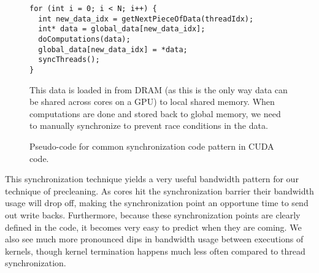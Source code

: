 \begin{figure}[htb]
\begin{center}

\begin{lstlisting}
for (int i = 0; i < N; i++) {
  int new_data_idx = getNextPieceOfData(threadIdx);
  int* data = global_data[new_data_idx];
  doComputations(data);
  global_data[new_data_idx] = *data;
  syncThreads();
}
\end{lstlisting}
\caption{Pseudo-code for common synchronization code pattern in CUDA code.} This data is loaded in from DRAM (as this is the only way data can be shared across cores on a GPU) to local shared memory. When computations are done and stored back to global memory, we need to manually synchronize to prevent race conditions in the data.
\label{f:cuda_sync}
\end{center}
\end{figure}
%


This synchronization technique yields a very useful bandwidth pattern for our technique of precleaning. As cores hit the synchronization barrier their bandwidth usage will drop off, making the synchronization point an opportune time to send out write backs. Furthermore, because these synchronization points are clearly defined in the code, it becomes very easy to predict when they are coming. We also see much more pronounced dips in bandwidth usage between executions of kernels, though kernel termination happens much less often compared to thread synchronization.
